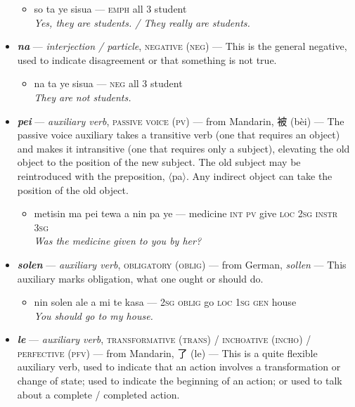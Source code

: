 \documentclass[a4paper]{article}
\begin{document}
\begin{itemize}
	\begin{itemize}
		\item so ta ye sisua — \textsc{emph} all 3 student \\\textit{Yes, they are students. / They really are students.}
	\end{itemize}
	\item \textbf{\textit{na}} — \textit{interjection / particle}, \textsc{negative (neg)} — This is the general negative, used to indicate disagreement or that something is not true.
	\begin{itemize}
		\item na ta ye sisua — \textsc{neg} all 3 student \\\textit{They are not students.}
	\end{itemize}
	\item \textbf{\textit{pei}} — \textit{auxiliary verb}, \textsc{passive voice (pv)}  — from Mandarin, 被 (bèi) — The passive voice auxiliary takes a transitive verb (one that requires an object) and makes it intransitive (one that requires only a subject), elevating the old object to the position of the new subject. The old subject may be reintroduced with the preposition, $\langle$pa$\rangle$. Any indirect object can take the position of the old object.
	\begin{itemize}
		\item metisin ma pei tewa a nin pa ye — medicine \textsc{int pv} give \textsc{loc 2sg instr 3sg} \\\textit{Was the medicine given to you by her?}
	\end{itemize}
	\item \textbf{\textit{solen}} — \textit{auxiliary verb}, \textsc{obligatory (oblig)} — from German, \textit{sollen} — This auxiliary marks obligation, what one ought or should do.
	\begin{itemize}
		\item nin solen ale a mi te kasa — \textsc{2sg oblig} go \textsc{loc 1sg gen} house \\\textit{You should go to my house.}
	\end{itemize}
	\item \textbf{\textit{le}} — \textit{auxiliary verb}, \textsc{transformative (trans) / inchoative (incho) / perfective (pfv)} — from Mandarin, 了 (le) — This is a quite flexible auxiliary verb, used to indicate that an action involves a transformation or change of state; used to indicate the beginning of an action; or used to talk about a complete / completed action.
	\begin{itemize}

\end{itemize}
\end{itemize}
\end{document}
